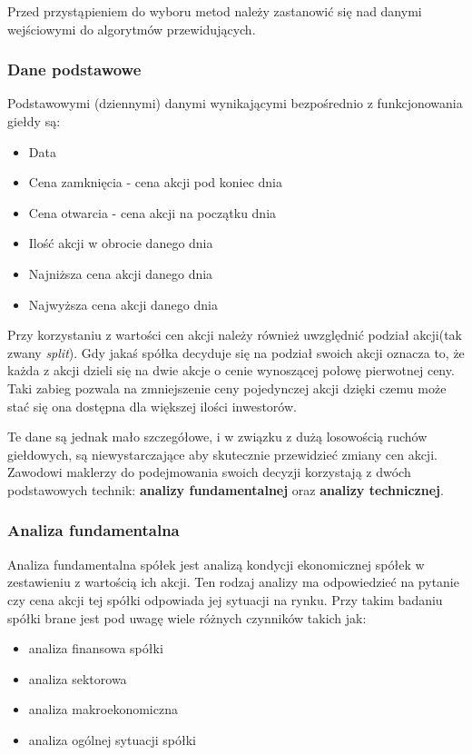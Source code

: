 \documentclass[a4paper, twoside, 11pt, openright]{article}
\begin{document}
Przed przystąpieniem do wyboru metod należy zastanowić się nad danymi wejściowymi do algorytmów przewidujących. 

\subsubsection{Dane podstawowe}

Podstawowymi (dziennymi) danymi wynikającymi bezpośrednio z funkcjonowania giełdy są:

\begin{itemize}
\item{Data}
\item{Cena zamknięcia} - cena akcji pod koniec dnia
\item{Cena otwarcia} - cena akcji na początku dnia
\item{Ilość akcji w obrocie danego dnia}
\item{Najniższa cena akcji danego dnia}
\item{Najwyższa cena akcji danego dnia}
\end{itemize}

 Przy korzystaniu z wartości cen akcji należy również uwzględnić podział akcji(tak zwany \textit{split}). Gdy jakaś spółka decyduje się na podział swoich akcji oznacza to, że każda z akcji dzieli się na dwie akcje o cenie wynoszącej połowę pierwotnej ceny. Taki zabieg pozwala na zmniejszenie ceny pojedynczej akcji dzięki czemu może stać się ona dostępna dla większej ilości inwestorów. 
 
\bigskip

Te dane są jednak mało szczegółowe, i w związku z dużą losowością ruchów giełdowych, są niewystarczające aby skutecznie przewidzieć zmiany cen akcji. Zawodowi maklerzy do podejmowania swoich decyzji korzystają z dwóch podstawowych technik: \textbf{analizy fundamentalnej} oraz \textbf{analizy technicznej}.

\subsubsection{Analiza fundamentalna \cite{fundamentalanalysis}}

Analiza fundamentalna spółek jest analizą kondycji ekonomicznej spółek w zestawieniu z wartością ich akcji. Ten rodzaj analizy ma odpowiedzieć na pytanie czy cena akcji tej spółki odpowiada jej sytuacji na rynku. Przy takim badaniu spółki brane jest pod uwagę wiele różnych czynników takich jak:
\begin{itemize}
\item{analiza finansowa spółki}
\item{analiza sektorowa}
\item{analiza makroekonomiczna}
\item{analiza ogólnej sytuacji spółki}
\end{itemize}
\end{document}
